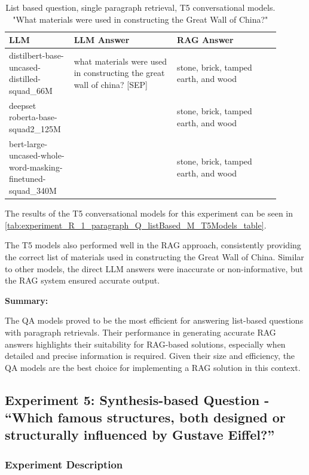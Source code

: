 \documentclass{wseas}
\begin{document}
\begin{table}[htbp]
  \centering
  \caption{List based question, single paragraph retrieval, T5 conversational models. "What materials were used in constructing the Great Wall of China?"}
  \label{tab:experiment_R_1_paragraph_Q_listBased_M_T5Models_table}  %
  \begin{tabular}{|p{0.20\linewidth}|p{0.35\linewidth}|p{0.35\linewidth}|}
    \hline
    \textbf{LLM} & \textbf{LLM Answer} & \textbf{RAG Answer} \\
    \hline
    distilbert-base-uncased-distilled-squad\_66M & what materials were used in constructing the great wall of china? {[}SEP{]} & stone, brick, tamped earth, and wood \\
    \hline
    deepset roberta-base-squad2\_125M & & stone, brick, tamped earth, and wood \\
    \hline
    bert-large-uncased-whole-word-masking-finetuned-squad\_340M & & stone, brick, tamped earth, and wood \\
    \hline
  \end{tabular}
\end{table}

The results of the T5 conversational models for this experiment can be seen 
in \autoref{tab:experiment_R_1_paragraph_Q_listBased_M_T5Models_table}.

The T5 models also performed well in the RAG approach, consistently
providing the correct list of materials used in constructing the Great
Wall of China. Similar to other models, the direct LLM answers were
inaccurate or non-informative, but the RAG system ensured accurate
output.

\textbf{Summary:}


The QA models proved to be the most efficient for answering list-based
questions with paragraph retrievals. Their performance in generating
accurate RAG answers highlights their suitability for RAG-based
solutions, especially when detailed and precise information is required.
Given their size and efficiency, the QA models are the best choice for
implementing a RAG solution in this context.


\subsection{Experiment 5: Synthesis-based Question - ``Which famous
structures, both designed or structurally influenced by Gustave
Eiffel?''}

\subsubsection{Experiment Description}
\end{document}
